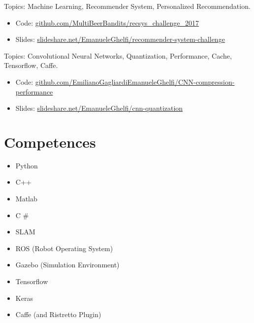 \documentclass[11pt,a4paper,sans]{moderncv} %
\begin{document}
{
Topics: Machine Learning, Recommender System, Personalized Recommendation.
\begin{itemize}
	\item Code: \href{https://github.com/MultiBeerBandits/recsys\_challenge\_2017}{github.com/MultiBeerBandits/recsys\_challenge\_2017}
	\item Slides: \href{https://www.slideshare.net/EmanueleGhelfi/recommender-system-challenge}{slideshare.net/EmanueleGhelfi/recommender-system-challenge}
\end{itemize}
}


{
Topics: Convolutional Neural Networks, Quantization, Performance, Cache, Tensorflow, Caffe. 
\begin{itemize}
	\item Code: \href{https://github.com/EmilianoGagliardiEmanueleGhelfi/CNN-compression-performance}{github.com/EmilianoGagliardiEmanueleGhelfi/CNN-compression-performance}
	\item Slides: \href{https://www.slideshare.net/EmanueleGhelfi/cnn-quantization}{slideshare.net/EmanueleGhelfi/cnn-quantization}
\end{itemize}
}



\section{Competences}

{
\begin{itemize}
\item Python
\item C++
\item Matlab
\item C \#
\end{itemize}
}
{
\begin{itemize}
\item SLAM
\item ROS (Robot Operating System)
\item Gazebo (Simulation Environment)
\end{itemize}
}
{
\begin{itemize}
\item Tensorflow
\item Keras
\item Caffe (and Ristretto Plugin)
\end{itemize}
}
\end{document}
